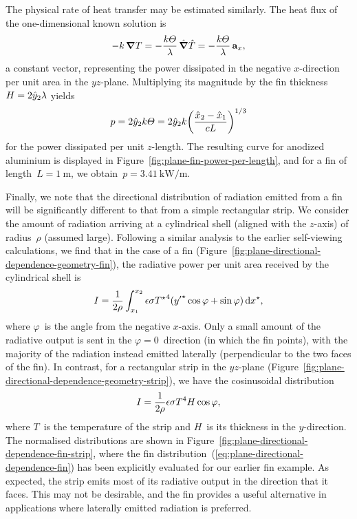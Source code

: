 The physical rate of heat transfer may be estimated similarly.
The heat flux of the one-dimensional known solution is
\begin{equation}
  {-k} \mathop{}\!\boldsymbol{\mathbf{\nabla}} T
    = -\frac{k \varTheta}{\lambda} \mathop{}\!\hat{\mathop{}\!\boldsymbol{\mathbf{\nabla}}}\hat{T}
    = -\frac{k \varTheta}{\lambda} \mathop{}\!\boldsymbol{\mathbf{a}}_{x},
  \label{eq:plane-heat-flux}
\end{equation}
a constant vector,
representing the power dissipated in the negative $x$-direction
per unit area in the $yz$-plane.
Multiplying its magnitude by the fin thickness~$H = 2 \hat{y}_2 \lambda$
yields
\begin{equation}
  p = 2 \scaled{y}_2 \conduc \Theta
    =
      2 \scaled{y}_2 \conduc
      \roundbr*{\frac{\scaled{x}_2 - \scaled{x}_1}{c L}}^{1/3}
  \label{eq:plane-fin-power-per-length}
\end{equation}
for the power dissipated per unit $z$-length.
The resulting curve for anodized aluminium
is displayed in Figure~\ref{fig:plane-fin-power-per-length},
and for a fin of length~$L = \SI{1}{\metre}$,
we obtain~$p = \SI{3.41}{\kilo\watt \per\metre}$.

Finally, we note that
the directional distribution of radiation emitted from a fin
will be significantly different
to that from a simple rectangular strip.
We consider the amount of radiation
arriving at a cylindrical shell (aligned with the $z$-axis)
of radius~$\rho$ (assumed large).
Following a similar analysis to the earlier self-viewing calculations,
we find that in the case of a fin
(Figure~\ref{fig:plane-directional-dependence-geometry-fin}),
the radiative power per unit area received by the cylindrical shell
is
\begin{equation}
  I =
    \frac{1}{2 \rho}
    \int_{x_1}^{x_2}
      \epsilon \sigma {T^\star}^4
      ({y'}^\star \cos\varphi + \sin\varphi)
    \mathop{}\!\mathrm{d} x^\star,
  \label{eq:plane-directional-dependence-fin}
\end{equation}
where $\varphi$~is the angle from the negative $x$-axis.
Only a small amount of the radiative output
is sent in the $\varphi = 0$~direction
(in which the fin points),
with the majority of the radiation instead emitted laterally
(perpendicular to the two faces of the fin).
In contrast,
for a rectangular strip in the $yz$-plane
(Figure~\ref{fig:plane-directional-dependence-geometry-strip}),
we have the cosinusoidal distribution
\begin{equation}
  I = \frac{1}{2 \rho} \epsilon \sigma T^4 H \cos\varphi,
  \label{eq:plane-directional-dependence-strip}
\end{equation}
where $T$~is the temperature of the strip
and $H$~is its thickness in the $y$-direction.
The normalised distributions are shown
in Figure~\ref{fig:plane-directional-dependence-fin-strip},
where the fin distribution~(\ref{eq:plane-directional-dependence-fin})
has been explicitly evaluated for our earlier fin example.
As expected,
the strip emits most of its radiative output in the direction that it faces.
This may not be desirable,
and the fin provides a useful alternative
in applications where laterally emitted radiation is preferred.

